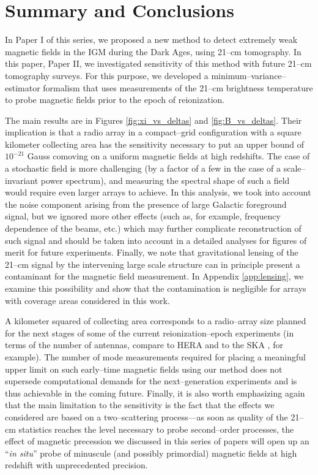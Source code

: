 \section{Summary and Conclusions}
\label{sec:conclusions}

In Paper I of this series, we proposed a new method to detect extremely weak magnetic fields in the IGM during the Dark Ages, using 21--cm tomography. In this paper, Paper II, we investigated sensitivity of this method with future 21--cm tomography surveys. For this purpose, we developed a minimum--variance--estimator formalism that uses measurements of the 21--cm brightness temperature to probe magnetic fields prior to the epoch of reionization. 

The main results are in Figures \ref{fig:xi_vs_deltas} and \ref{fig:B_vs_deltas}. Their implication is that a radio array in a compact--grid configuration with a square kilometer collecting area has the sensitivity necessary to put an upper bound of $10^{-21}$ Gauss comoving on a uniform magnetic fields at high redshifts. The case of a stochastic field is more challenging (by a factor of a few in the case of a scale--invariant power spectrum), and measuring the spectral shape of such a field would require even larger arrays to achieve. In this analysis, we took into account the noise component arising from the presence of large Galactic foreground signal, but we ignored more other effects (such as, for example, frequency dependence of the beams, etc.) which may further complicate reconstruction of such signal and should be taken into account in a detailed analyses for figures of merit for future experiments. Finally, we note that gravitational lensing of the 21--cm signal by the intervening large scale structure can in principle present a contaminant for the magnetic field measurement. In Appendix \ref{app:lensing}, we examine this possibility and show that the contamination is negligible for arrays with coverage areas considered in this work.

A kilometer squared of collecting area corresponds to a radio--array size planned for the next stages of some of the current reionization--epoch experiments (in terms of the number of antennas, compare to HERA and to the SKA \cite{2008arXiv0802.1727C}, for example). The number of mode measurements required for placing a meaningful upper limit on such early--time magnetic fields using our method does not supersede computational demands for the next--generation  experiments and is thus achievable in the coming future. Finally, it is also worth emphasizing again that the main limitation to the sensitivity is the fact that the effects we considered are based on a two--scattering process---as soon as quality of the 21--cm statistics reaches the level necessary to probe second--order processes, the effect of magnetic precession we discussed in this series of papers will open up an ``\textit{in situ}'' probe of minuscule (and possibly primordial) magnetic fields at high redshift with unprecedented precision. 

  